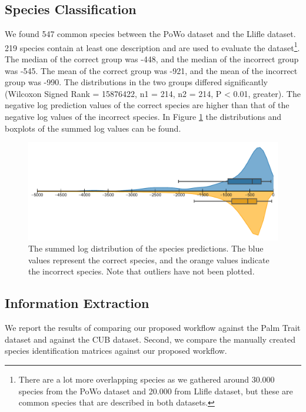 \documentclass[a4paper, 12pt, oneside]{book} %
\begin{document}
\subsection{Species Classification}
We found 547 common species between the PoWo dataset and the Llifle dataset.
219 species contain at least one description and are used to evaluate the dataset\footnote{There are a lot more overlapping species as we gathered around 30.000 species from the PoWo dataset and 20.000 from Llifle dataset, but these are common species that are described in both datasets.}.
The median of the correct group was -448, and the median of the incorrect group was -545.
The mean of the correct group was -921, and the mean of the incorrect group was -990.
The distributions in the two groups differed significantly (Wilcoxon Signed Rank = 15876422, n1 = 214, n2 = 214, P < 0.01, greater).
The negative log prediction values of the correct species are higher than that of the negative log values of the incorrect species. 
In Figure \ref{fig:Log_dist} the distributions and boxplots of the summed log values can be found.

\begin{figure}[htpb]
 \centering
 \includegraphics[width=\textwidth]{figures/log_plot.pdf}
 \caption[Log Distribution]{The summed log distribution of the species predictions. The blue values represent the correct species, and the orange values indicate the incorrect species. Note that outliers have not been plotted.}
 \label{fig:Log_dist}
\end{figure}


\subsection{Information Extraction}
We report the results of comparing our proposed workflow against the Palm Trait dataset and against the CUB dataset.
Second, we compare the manually created species identification matrices against our proposed workflow.
\end{document}
